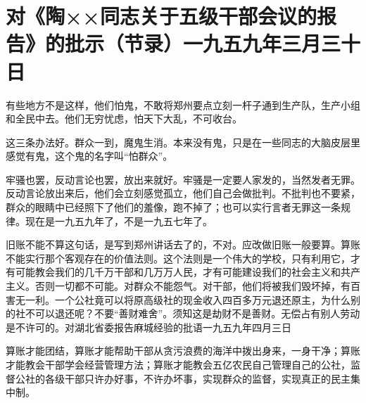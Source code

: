 \section[对《陶××同志关于五级干部会议的报告》的批示（节录）一九五九年三月三十日]{对《陶××同志关于五级干部会议的报告》的批示（节录）一九五九年三月三十日}


有些地方不是这样，他们怕鬼，不敢将郑州要点立刻一杆子通到生产队，生产小组和全民中去。他们无穷忧虑，怕天下大乱，不可收台。

这三条办法好。群众一到，魔鬼生消。本来没有鬼，只是在一些同志的大脑皮层里感觉有鬼，这个鬼的名字叫“怕群众”。

牢骚也罢，反动言论也罢，放出来就好。牢骚是一定要人家发的，当然发者无罪。反动言论放出来后，他们会立刻感觉孤立，他们自己会做批判。不批判也不要紧，群众的眼睛中已经照下了他们的羞像，跑不掉了；也可以实行言者无罪这一条规律。现在是一九五九年了，不是一九五七年了。

旧账不能不算这句话，是写到郑州讲话去了的，不对。应改做旧账一般要算。算账不能实行那个客观存在的价值法则。这个法则是一个伟大的学校，只有利用它，才有可能教会我们的几千万干部和几万万人民，才有可能建设我们的社会主义和共产主义。否则一切都不可能。对群众不能怨气。对干部，他们将被我们毁坏掉，有百害无一利。一个公社竟可以将原高级社的现金收入四百多万元退还原主，为什么别的社不可以退还呢？不要“善财难舍”。须知这是劫财不是善财。无偿占有别人劳动是不许可的。对湖北省委报告麻城经验的批语一九五九年四月三日

算账才能团结，算账才能帮助干部从贪污浪费的海洋中拨出身来，一身干净；算账才能教会干部学会经营管理方法；算账才能教会五亿农民自己管理自己的公社，监督公社的各级干部只许办好事，不许办坏事，实现群众的监督，实现真正的民主集中制。



